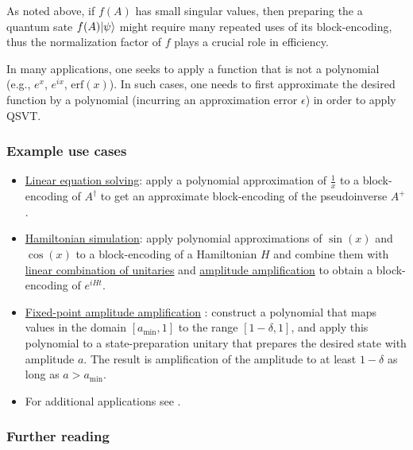 \begin{refsection}
As noted above, if $f(A)$ has small singular values, then preparing the a quantum sate $f(A)\lvert\psi\rangle$ might require many repeated uses of its block-encoding, thus the normalization factor of $f$ plays a crucial role in efficiency.

In many applications, one seeks to apply a function that is not a polynomial (e.g., $e^x$, $e^{ix}$, $\mathrm{erf}(x)$). In such cases, one needs to first approximate the desired function by a polynomial (incurring an approximation error $\epsilon$) in order to apply QSVT. 



\subsubsection*{Example use cases}
\begin{itemize}
    \item \hyperref[prim:QuantumLinearSystemSolvers]{Linear equation solving}: apply a polynomial approximation of $\frac{1}{x}$ to a block-encoding of $A^\dagger$ to get an approximate block-encoding of the pseudoinverse $A^+$.
    \item \hyperref[prim:QSPqubitization]{Hamiltonian simulation}: apply polynomial approximations of $\sin(x)$ and $\cos(x)$ to a block-encoding of a Hamiltonian $H$ and combine them with \hyperref[prim:LCU]{linear combination of unitaries} and \hyperref[prim:AmpAmp]{amplitude amplification} to obtain a block-encoding of $e^{iHt}$.
    \item \hyperref[prim:AA]{Fixed-point amplitude amplification} \cite{yoder2014FixedPointSearch}: construct a polynomial that maps values in the domain $[a_{\min},1]$ to the range $[1-\delta,1]$, and apply this polynomial to a state-preparation unitary that prepares the desired state with amplitude $a$. The result is amplification of the amplitude to at least $1-\delta$ as long as $a > a_{\min}$.
    \item For additional applications see \cite{gilyen2018QSingValTransf,Rall2021fastercoherent,martyn2021GrandUnificationQAlgs,lin2019OptimalQEigenstateFiltering,lin2020NearOptimalGroundState}.
\end{itemize}



\subsubsection*{Further reading}



\end{refsection}
